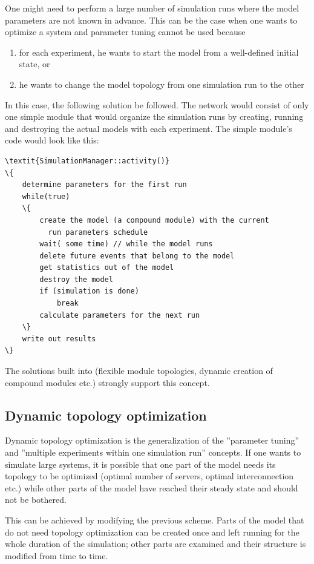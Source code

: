 One might need to perform a large number of simulation runs where 
the model parameters are not known in advance. This can be the 
case when one wants to optimize a system and parameter tuning 
cannot be used because
\begin{enumerate}
\item{for each experiment, he wants to start the model from a
    well-defined initial state, or}
\item{he wants to change the model topology from one simulation run to
    the other}
\end{enumerate}

In this case, the following solution be followed. The network would
consist of only one simple module that would
organize the simulation runs by creating, running and destroying the
actual models with each experiment. The simple
module's code would look like this:


\begin{Verbatim}[commandchars=\\\{\}]
\textit{SimulationManager::activity()}
\{
    determine parameters for the first run
    while(true)
    \{
        create the model (a compound module) with the current
          run parameters schedule
        wait( some time) // while the model runs
        delete future events that belong to the model
        get statistics out of the model
        destroy the model
        if (simulation is done)
            break
        calculate parameters for the next run
    \}
    write out results
\}
\end{Verbatim}
  

The solutions built into {\opp} (flexible module topologies, dynamic
creation of compound modules etc.) strongly
support this concept.





\subsection{Dynamic topology optimization}

Dynamic topology optimization is
the generalization of the ''parameter tuning'' and ''multiple
experiments within one simulation run'' concepts. If one wants to
simulate large systems, it is possible that one part of the model
needs its topology to be optimized (optimal number of servers, optimal
interconnection etc.) while other parts of the model have reached
their steady state and should not be bothered.


This can be achieved by modifying the previous scheme. Parts 
of the model that do not need topology optimization can be created 
once and left running for the whole duration of the simulation; 
other parts are examined and their structure is modified from 
time to time.



